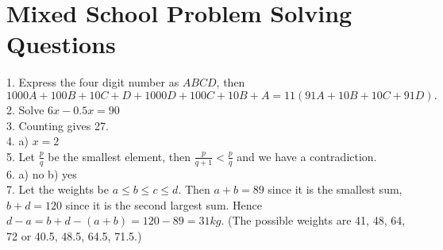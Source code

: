 \documentclass[a4paper]{article}
\begin{document}
\section*{Mixed School Problem Solving Questions}

1. Express the four digit number as $ABCD$, then $$1000A + 100B + 10C + D + 1000D + 100C + 10B + A = 11(91A + 10B + 10C + 91D).$$ 
2. Solve $6x-0.5x=90$ \\
3. Counting gives 27. \\
4. a) $x=2$ \\
5. Let $\frac{p}{q}$ be the smallest element, then $\frac{p}{q+1} < \frac{p}{q}$ and we have a contradiction. \\
6. a) no b) yes\\
7. Let the weights be $a \le b \le c \le d$. Then $a + b = 89$ since it
is the smallest sum, $b + d = 120$ since it is the second largest sum. Hence
$d - a = b + d - (a + b) = 120 - 89 = 31kg$.
(The possible weights are 41, 48, 64, 72 or 40.5, 48.5, 64.5, 71.5.)



\end{document}

